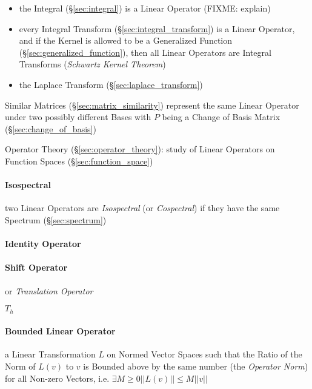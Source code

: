 \begin{itemize}
  \item the Integral (\S\ref{sec:integral}) is a Linear Operator (FIXME:
    explain)
  \item every Integral Transform (\S\ref{sec:integral_transform}) is a Linear
    Operator, and if the Kernel is allowed to be a Generalized Function
    (\S\ref{sec:generalized_function}), then all Linear Operators are Integral
    Transforms (\emph{Schwartz Kernel Theorem})
  \item the Laplace Transform (\S\ref{sec:laplace_transform})
\end{itemize}

Similar Matrices (\S\ref{sec:matrix_similarity}) represent the same Linear
Operator under two possibly different Bases with $P$ being a Change of Basis
Matrix (\S\ref{sec:change_of_basis})

\fist Operator Theory (\S\ref{sec:operator_theory}): study of Linear Operators
on Function Spaces (\S\ref{sec:function_space})



\paragraph{Isospectral}\label{sec:isospectral}\hfill

two Linear Operators are \emph{Isospectral} (or \emph{Cospectral}) if they have
the same Spectrum (\S\ref{sec:spectrum})



\paragraph{Identity Operator}\label{sec:identity_operator}\hfill

\paragraph{Shift Operator}\label{sec:shift_operator}\hfill

or \emph{Translation Operator}

$T_h$



\paragraph{Bounded Linear Operator}\label{sec:bounded_linear_operator}\hfill

a Linear Transformation $L$ on Normed Vector Spaces such that the Ratio of the
Norm of $L(v)$ to $v$ is Bounded above by the same number (the \emph{Operator
  Norm}) for all Non-zero Vectors, i.e. $\exists M \geq 0 ||L(v)|| \leq M||v||$

